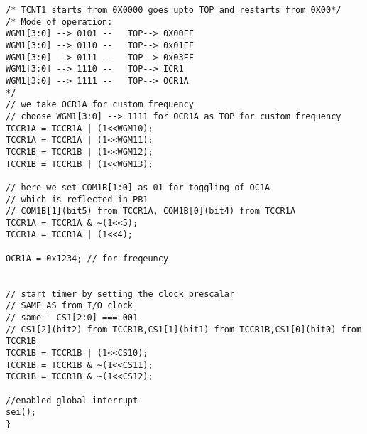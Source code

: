 \documentclass{article}
\begin{document}
\begin{verbatim}
/* TCNT1 starts from 0X0000 goes upto TOP and restarts from 0X00*/
/* Mode of operation:
WGM1[3:0] --> 0101 --	TOP--> 0X00FF
WGM1[3:0] --> 0110 --	TOP--> 0x01FF
WGM1[3:0] --> 0111 --	TOP--> 0x03FF
WGM1[3:0] --> 1110 --	TOP--> ICR1
WGM1[3:0] --> 1111 --	TOP--> OCR1A
*/	
// we take OCR1A for custom frequency 
// choose WGM1[3:0] --> 1111 for OCR1A as TOP for custom frequency
TCCR1A = TCCR1A | (1<<WGM10);
TCCR1A = TCCR1A | (1<<WGM11);
TCCR1B = TCCR1B | (1<<WGM12);
TCCR1B = TCCR1B | (1<<WGM13);	

// here we set COM1B[1:0] as 01 for toggling of OC1A
// which is reflected in PB1
// COM1B[1](bit5) from TCCR1A, COM1B[0](bit4) from TCCR1A
TCCR1A = TCCR1A & ~(1<<5);
TCCR1A = TCCR1A | (1<<4);

OCR1A = 0x1234; // for freqeuncy


// start timer by setting the clock prescalar
// SAME AS from I/O clock
// same-- CS1[2:0] === 001
// CS1[2](bit2) from TCCR1B,CS1[1](bit1) from TCCR1B,CS1[0](bit0) from TCCR1B
TCCR1B = TCCR1B | (1<<CS10);
TCCR1B = TCCR1B & ~(1<<CS11);
TCCR1B = TCCR1B & ~(1<<CS12);

//enabled global interrupt
sei();
}
\end{verbatim}
\end{document}
